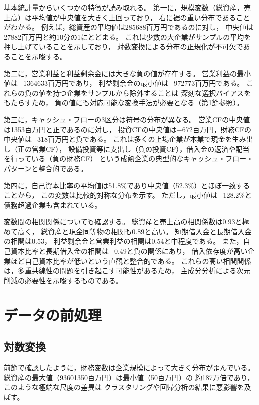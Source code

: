 基本統計量からいくつかの特徴が読み取れる。
第一に，規模変数（総資産，売上高）は平均値が中央値を大きく上回っており，
右に裾の重い分布であることがわかる。
例えば，総資産の平均値は\num{285688}百万円であるのに対し，
中央値は\num{27882}百万円と約10分の1にとどまる。
これは少数の大企業がサンプルの平均を押し上げていることを示しており，
対数変換による分布の正規化が不可欠であることを示唆する。

第二に，営業利益と利益剰余金には大きな負の値が存在する。
営業利益の最小値は$-$\num{1364633}百万円であり，
利益剰余金の最小値は$-$\num{972773}百万円である。
これらの負の値を持つ企業をサンプルから除外することは
深刻な選択バイアスをもたらすため，
負の値にも対応可能な変換手法が必要となる（第\ref{sec:preprocessing}節参照）。

第三に，キャッシュ・フローの3区分は符号の分布が異なる。
営業CFの中央値は\num{1353}百万円と正であるのに対し，
投資CFの中央値は$-$672百万円，財務CFの中央値は$-$318百万円と負である。
これは多くの上場企業が本業で現金を生み出し（正の営業CF），
設備投資等に支出し（負の投資CF），借入金の返済や配当を行っている（負の財務CF）
という成熟企業の典型的なキャッシュ・フロー・パターンと整合的である。

第四に，自己資本比率の平均値は51.8\%であり中央値（52.3\%）とほぼ一致することから，
この変数は比較的対称な分布を示す。
ただし，最小値は$-$128.2\%と債務超過企業も含まれている。

変数間の相関関係についても確認する。
総資産と売上高の相関係数は0.93と極めて高く，
総資産と現金同等物の相関も0.89と高い。
短期借入金と長期借入金の相関は0.53，
利益剰余金と営業利益の相関は0.54と中程度である。
また，自己資本比率と長期借入金の相関は$-$0.49と負の関係にあり，
借入依存度が高い企業ほど自己資本比率が低いという直観と整合的である。
これらの高い相関関係は，多重共線性の問題を引き起こす可能性があるため，
主成分分析による次元削減の必要性を示唆するものである。

\section{データの前処理}
\label{sec:preprocessing}

\subsection{対数変換}
\label{subsec:log-transform}

前節で確認したように，財務変数は企業規模によって大きく分布が歪んでいる。
総資産の最大値（\num{93601350}百万円）は最小値（50百万円）の
約187万倍であり，このような極端な尺度の差異は
クラスタリングや回帰分析の結果に悪影響を及ぼす。

